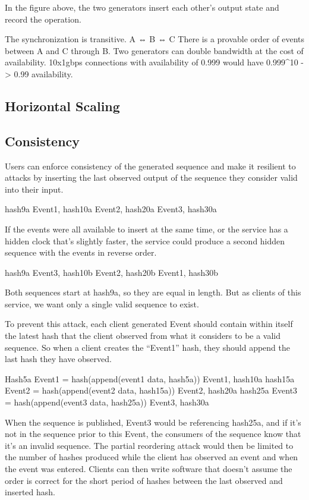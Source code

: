 \documentclass[12pt]{article}
\begin{document}
In the figure above, the two generators insert each other’s output state and record the operation.  

The synchronization is transitive.  A ⇔ B ⇔ C  There is a provable order of events between A and C through B.  Two generators can double bandwidth at the cost of availability.  10x1gbps connections with availability of 0.999 would have 0.999^10 -> 0.99 availability.
\subsection{Horizontal Scaling}
\subsection{Consistency}
Users can enforce consistency of the generated sequence and make it resilient to attacks by inserting the last observed output of the sequence they consider valid into their input.

hash9a
Event1, hash10a
Event2, hash20a
Event3, hash30a

If the events were all available to insert at the same time, or the service has a hidden clock that's slightly faster, the service could produce a second hidden sequence with the events in reverse order.  

hash9a
Event3, hash10b
Event2, hash20b
Event1, hash30b

Both sequences start at hash9a, so they are equal in length.  But as clients of this service, we want only a single valid sequence to exist. 

To prevent this attack, each client generated Event should contain within itself the latest hash that the client observed from what it considers to be a valid sequence.  So when a client creates the “Event1” hash, they should append the last hash they have observed.

Hash5a
Event1 = hash(append(event1 data, hash5a))
Event1, hash10a
hash15a
Event2 = hash(append(event2 data, hash15a))
Event2, hash20a
hash25a
Event3 = hash(append(event3 data, hash25a))
Event3, hash30a

When the sequence is published, Event3 would be referencing hash25a, and if it’s not in the sequence prior to this Event, the consumers of the sequence know that it’s an invalid sequence.  The partial reordering attack would then be limited to the number of hashes produced while the client has observed an event and when the event was entered.  Clients can then write software that doesn’t assume the order is correct for the short period of hashes between the last observed and inserted hash.
\end{document}
